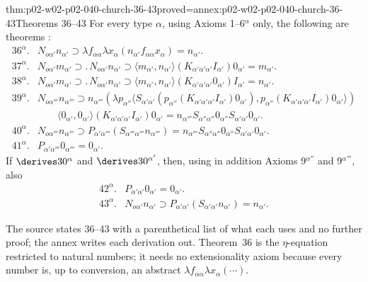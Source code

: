 \begin{hbtheorem}{thm:p02-w02-p02-040-church-36-43}{proved=annex:p02-w02-p02-040-church-36-43}{Theorems 36--43}
For every type \(\alpha\), using Axioms 1--6\(^\alpha\) only, the following are
theorems \cite[\S8, p.~68]{Church1940}:
\[
\begin{array}{rl}
 36^\alpha. & N_{o\alpha'}n_{\alpha'}\supset\lambda f_{\alpha\alpha}\lambda x_\alpha(n_{\alpha'}f_{\alpha\alpha}x_\alpha)=n_{\alpha'}.\\
 37^\alpha. & N_{o\alpha'}m_{\alpha'}\supset.\,N_{o\alpha'}n_{\alpha'}\supset\langle m_{\alpha'},n_{\alpha'}\rangle(K_{\alpha'\alpha'\alpha'}I_{\alpha'})0_{\alpha'}=m_{\alpha'}.\\
 38^\alpha. & N_{o\alpha'}m_{\alpha'}\supset.\,N_{o\alpha'}n_{\alpha'}\supset\langle m_{\alpha'},n_{\alpha'}\rangle(K_{\alpha'\alpha'\alpha'}0_{\alpha'})I_{\alpha'}=n_{\alpha'}.\\
 39^\alpha. & N_{o\alpha'''}n_{\alpha'''}\supset n_{\alpha'''}(\lambda p_{\alpha''}\langle S_{\alpha'\alpha'}(p_{\alpha''}(K_{\alpha'\alpha'\alpha'}I_{\alpha'})0_{\alpha'}),p_{\alpha''}(K_{\alpha'\alpha'\alpha'}I_{\alpha'})0_{\alpha'}\rangle)\\
   & \qquad\langle0_{\alpha'},0_{\alpha'}\rangle(K_{\alpha'\alpha'\alpha'}I_{\alpha'})0_{\alpha'}
   =n_{\alpha'''}S_{\alpha''\alpha''}0_{\alpha''}S_{\alpha'\alpha'}0_{\alpha'}.\\
 40^\alpha. & N_{o\alpha'''}n_{\alpha'''}\supset P_{\alpha'\alpha'''}(S_{\alpha'''\alpha'''}n_{\alpha'''})=n_{\alpha'''}S_{\alpha''\alpha''}0_{\alpha''}S_{\alpha'\alpha'}0_{\alpha'}.\\
 41^\alpha. & P_{\alpha'\alpha'''}0_{\alpha'''}=0_{\alpha'}.
\end{array}
\]
If \(\derives30^\alpha\) and \(\derives30^{\alpha'}\), then, using in addition
Axioms 9\(^{\alpha''}\) and 9\(^{\alpha'''}\), also
\[
\begin{array}{rl}
 42^\alpha. & P_{\alpha'\alpha'}0_{\alpha'}=0_{\alpha'}.\\
 43^\alpha. & N_{o\alpha'}n_{\alpha'}\supset P_{\alpha'\alpha'}(S_{\alpha'\alpha'}n_{\alpha'})=n_{\alpha'}.
\end{array}
\]
\end{hbtheorem}

The source states 36--43 with a parenthetical list of what each uses and no
further proof; the annex writes each derivation out.  Theorem~36 is the
\(\eta\)-equation restricted to natural numbers; it needs no extensionality
axiom because every number is, up to conversion, an abstract
\(\lambda f_{\alpha\alpha}\lambda x_\alpha(\cdots)\).

